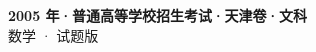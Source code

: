 \documentclass[zihao=-4, a4paper]{ctexart}
\begin{document}
\begin{center}
  {\Large\bfseries 2005 年·普通高等学校招生考试·天津卷·文科}\\[4pt]
  {\large 数学 · 试题版}
\end{center}
\medskip
{}

\end{document}
